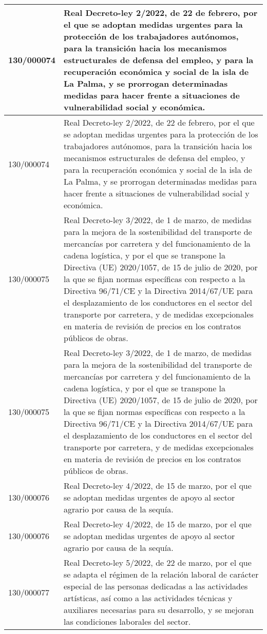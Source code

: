 {\begin{table}[H]
\begin{center}
\begin{tabularx}{\linewidth}{| l | X |}
\hline
130/000074 & Real Decreto-ley 2/2022, de 22 de febrero, por el que se adoptan medidas urgentes para la protección de los trabajadores autónomos, para la transición hacia los mecanismos estructurales de defensa del empleo, y para la recuperación económica y social de la isla de La Palma, y se prorrogan determinadas medidas para hacer frente a situaciones de vulnerabilidad social y económica. \\
\hline
130/000074 & Real Decreto-ley 2/2022, de 22 de febrero, por el que se adoptan medidas urgentes para la protección de los trabajadores autónomos, para la transición hacia los mecanismos estructurales de defensa del empleo, y para la recuperación económica y social de la isla de La Palma, y se prorrogan determinadas medidas para hacer frente a situaciones de vulnerabilidad social y económica. \\
\hline
130/000075 & Real Decreto-ley 3/2022, de 1 de marzo, de medidas para la mejora de la sostenibilidad del transporte de mercancías por carretera y del funcionamiento de la cadena logística, y por el que se transpone la Directiva (UE) 2020/1057, de 15 de julio de 2020, por la que se fijan normas específicas con respecto a la Directiva 96/71/CE y la Directiva 2014/67/UE para el desplazamiento de los conductores en el sector del transporte por carretera, y de medidas excepcionales en materia de revisión de precios en los contratos públicos de obras. \\
\hline
130/000075 & Real Decreto-ley 3/2022, de 1 de marzo, de medidas para la mejora de la sostenibilidad del transporte de mercancías por carretera y del funcionamiento de la cadena logística, y por el que se transpone la Directiva (UE) 2020/1057, de 15 de julio de 2020, por la que se fijan normas específicas con respecto a la Directiva 96/71/CE y la Directiva 2014/67/UE para el desplazamiento de los conductores en el sector del transporte por carretera, y de medidas excepcionales en materia de revisión de precios en los contratos públicos de obras. \\
\hline
130/000076 & Real Decreto-ley 4/2022, de 15 de marzo, por el que se adoptan medidas urgentes de apoyo al sector agrario por causa de la sequía. \\
\hline
130/000076 & Real Decreto-ley 4/2022, de 15 de marzo, por el que se adoptan medidas urgentes de apoyo al sector agrario por causa de la sequía. \\
\hline
130/000077 & Real Decreto-ley 5/2022, de 22 de marzo, por el que se adapta el régimen de la relación laboral de carácter especial de las personas dedicadas a las actividades artísticas, así como a las actividades técnicas y auxiliares necesarias para su desarrollo, y se mejoran las condiciones laborales del sector. \\

\end{tabularx}
\end{center}
\end{table}}
